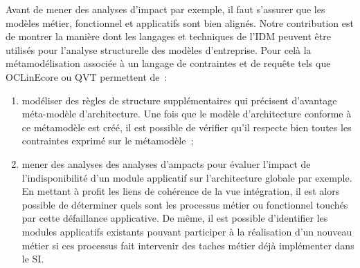 Avant de mener des analyses d'impact par exemple, il faut s'assurer que les modèles métier, fonctionnel et applicatifs sont bien alignés.
Notre contribution est de montrer la manière dont les langages et techniques de l'IDM peuvent être utilisés pour l'analyse structurelle des modèles d'entreprise. Pour celà la métamodélisation associée à un langage de contraintes et de requête tels que OCLinEcore ou QVT permettent de~:
\begin{enumerate}
\item modéliser des règles de structure supplémentaires qui précisent d'avantage méta-modèle d'architecture. Une fois que le modèle d'architecture conforme à ce métamodèle est créé, il est possible de vérifier qu'il respecte bien toutes les contraintes exprimé sur le métamodèle~;
\item mener des analyses des analyses d'ampacts pour évaluer l'impact de l'indisponibilité d'un module applicatif sur l'architecture globale par exemple. En mettant à profit les liens de cohérence de la vue intégration, il est alors possible de déterminer quels sont les processus métier ou fonctionnel touchés par cette défaillance applicative. De même, il est possible d'identifier les modules applicatifs existants pouvant participer à la réalisation d'un nouveau métier si ces processus fait intervenir des taches métier déjà implémenter dans le SI.
\end{enumerate}


 







